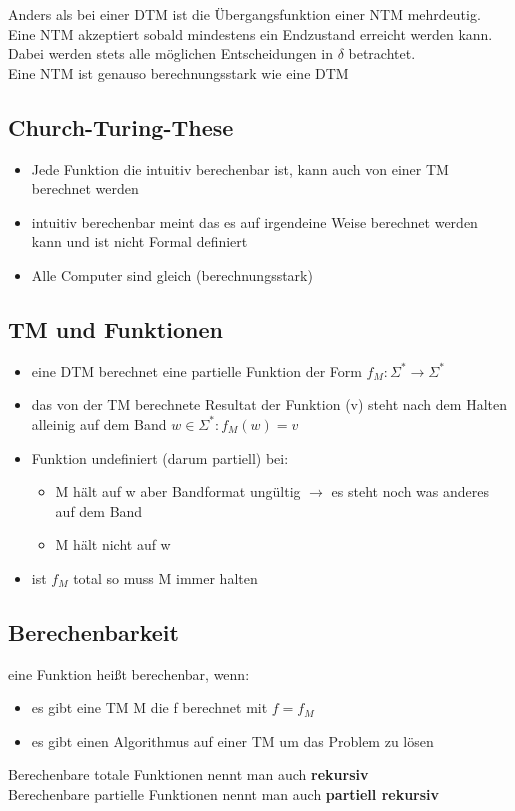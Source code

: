 \documentclass[12pt,a4paper]{article}
\begin{document}
Anders als bei einer DTM ist die Übergangsfunktion einer NTM mehrdeutig.
Eine NTM akzeptiert sobald mindestens ein Endzustand erreicht werden kann. Dabei werden stets alle möglichen Entscheidungen in $\delta$ betrachtet.
\\
Eine NTM ist genauso berechnungsstark wie eine DTM

\subsection{Church-Turing-These}
\begin{itemize}
\item Jede Funktion die intuitiv berechenbar ist, kann auch von einer TM berechnet werden
\item intuitiv berechenbar meint das es auf irgendeine Weise berechnet werden kann und ist nicht Formal definiert
\item Alle Computer sind gleich (berechnungsstark)
\end{itemize}

\subsection{TM und Funktionen}
\begin{itemize}
\item eine DTM berechnet eine partielle Funktion der Form $f_M: \Sigma^* \rightarrow \Sigma^*$
\item das von der TM berechnete Resultat der Funktion (v) steht nach dem Halten alleinig auf dem Band $w \in \Sigma^*: f_M(w) = v$
\item Funktion undefiniert (darum partiell) bei:
\begin{itemize}
\item M hält auf w aber Bandformat ungültig $\rightarrow$ es steht noch was anderes auf dem Band
\item M hält nicht auf w

\end{itemize}
\item ist $f_M$ total so muss M immer halten
\end{itemize}

\subsection{Berechenbarkeit}
eine Funktion heißt berechenbar, wenn:
\begin{itemize}
\item es gibt eine TM M die f berechnet mit $f = f_M$
\item es gibt einen Algorithmus auf einer TM um das Problem zu lösen
\end{itemize}
Berechenbare totale Funktionen nennt man auch \textbf{rekursiv}\\
Berechenbare partielle Funktionen nennt man auch \textbf{partiell rekursiv}
\end{document}
